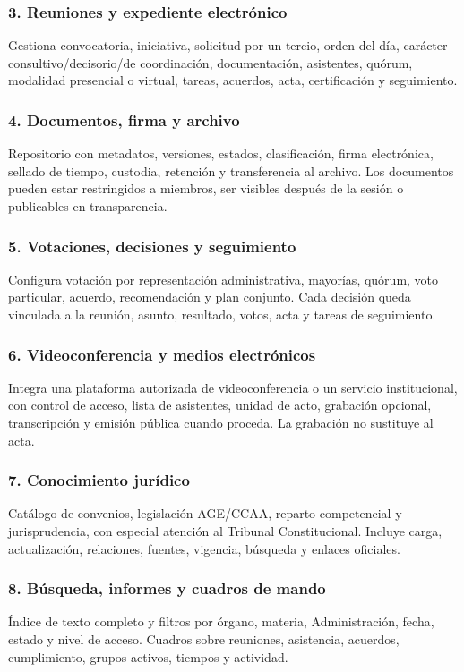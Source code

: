 \documentclass[11pt,a4paper]{article}
\begin{document}
\subsubsection{3. Reuniones y expediente electrónico}
Gestiona convocatoria, iniciativa, solicitud por un tercio, orden del día, carácter consultivo/decisorio/de coordinación, documentación, asistentes, quórum, modalidad presencial o virtual, tareas, acuerdos, acta, certificación y seguimiento.

\subsubsection{4. Documentos, firma y archivo}
Repositorio con metadatos, versiones, estados, clasificación, firma electrónica, sellado de tiempo, custodia, retención y transferencia al archivo. Los documentos pueden estar restringidos a miembros, ser visibles después de la sesión o publicables en transparencia.

\subsubsection{5. Votaciones, decisiones y seguimiento}
Configura votación por representación administrativa, mayorías, quórum, voto particular, acuerdo, recomendación y plan conjunto. Cada decisión queda vinculada a la reunión, asunto, resultado, votos, acta y tareas de seguimiento.

\subsubsection{6. Videoconferencia y medios electrónicos}
Integra una plataforma autorizada de videoconferencia o un servicio institucional, con control de acceso, lista de asistentes, unidad de acto, grabación opcional, transcripción y emisión pública cuando proceda. La grabación no sustituye al acta.

\subsubsection{7. Conocimiento jurídico}
Catálogo de convenios, legislación AGE/CCAA, reparto competencial y jurisprudencia, con especial atención al Tribunal Constitucional. Incluye carga, actualización, relaciones, fuentes, vigencia, búsqueda y enlaces oficiales.

\subsubsection{8. Búsqueda, informes y cuadros de mando}
Índice de texto completo y filtros por órgano, materia, Administración, fecha, estado y nivel de acceso. Cuadros sobre reuniones, asistencia, acuerdos, cumplimiento, grupos activos, tiempos y actividad.
\end{document}
